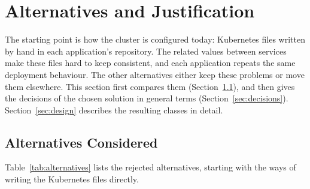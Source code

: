 \section{Alternatives and Justification}
\label{sec:alternatives}

The starting point is how the cluster is configured today: Kubernetes files
written by hand in each application's repository. The related values between
services make these files hard to keep consistent, and each application repeats
the same deployment behaviour. The other alternatives either keep these
problems or move them elsewhere. This section first compares them
(Section~\ref{sec:alternativesconsidered}), and then gives the decisions of the
chosen solution in general terms (Section~\ref{sec:decisions}).
Section~\ref{sec:design} describes the resulting classes in detail.

\subsection{Alternatives Considered}
\label{sec:alternativesconsidered}

Table~\ref{tab:alternatives} lists the rejected alternatives, starting with
the ways of writing the Kubernetes files directly.


